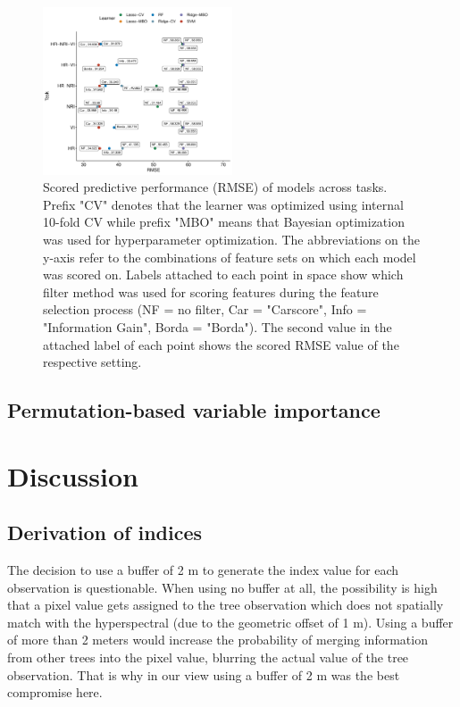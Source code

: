 \documentclass[letterpaper, journal]{IEEEtran}
\begin{document}
\begin{figure} [t!]
\centering
	\begin{center}
		\includegraphics[width=0.5\textwidth] {performance-results-1.pdf}
        \caption{Scored predictive performance (RMSE) of models across tasks. Prefix "CV" denotes that the learner was optimized using internal 10-fold CV while prefix "MBO" means that Bayesian optimization was used for hyperparameter optimization. The abbreviations on the y-axis refer to the combinations of feature sets on which each model was scored on. Labels attached to each point in space show which filter method was used for scoring features during the feature selection process (NF = no filter, Car = "Carscore", Info = "Information Gain", Borda = "Borda"). The second value in the attached label of each point shows the scored RMSE value of the respective setting.}
		\label{fig:perf-result}
	\end{center}
\end{figure}

\subsection{Permutation-based variable importance}
\section{Discussion}

\subsection{Derivation of indices}

\noindent The decision to use a buffer of 2 m to generate the index value for each observation is questionable.
When using no buffer at all, the possibility is high that a pixel value gets assigned to the tree observation which does not spatially match with the hyperspectral (due to the geometric offset of 1 m).
Using a buffer of more than 2 meters would increase the probability of merging information from other trees into the pixel value, blurring the actual value of the tree observation.
That is why in our view using a buffer of 2 m was the best compromise here.
\end{document}
